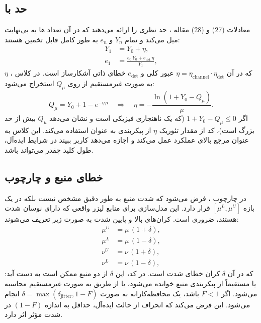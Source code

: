 \subsection{حد  با }

معادلات (27) و (28) مقاله ، حد نظری  را ارائه می‌دهند که در آن تعداد ‌ها به بی‌نهایت میل می‌کند و تمام $Y_n$ و $e_n$ به طور کامل قابل تخمین هستند:
\begin{align}
	Y_1 &= Y_0 + \eta, \\
	e_1 &= \frac{e_0\,Y_0 + e_{\text{det}}\,\eta}{Y_1},
\end{align}
که در آن $\eta = \eta_{\text{channel}} \cdot \eta_{\text{det}}$ عبور کلی و $e_{\text{det}}$ خطای ذاتی آشکارساز است. در کلاس ، $\eta$ به صورت غیرمستقیم از روی $Q_\mu$ استخراج می‌شود:
\begin{equation}
	Q_\mu = Y_0 + 1 - e^{-\eta\,\mu} \quad \Rightarrow \quad \eta = -\frac{\ln(1 + Y_0 - Q_\mu)}{\mu}.
\end{equation}
اگر $1 + Y_0 - Q_\mu \le 0$ (که یک ناهنجاری فیزیکی است و نشان می‌دهد $Q_\mu$ بیش از حد بزرگ است)، کد از مقدار تئوریک $\eta$ از پیکربندی به عنوان  استفاده می‌کند. این کلاس به عنوان مرجع بالای عملکرد عمل می‌کند و اجازه می‌دهد کاربر ببیند در شرایط ایده‌آل، طول کلید چقدر می‌تواند باشد.

\subsection{خطای منبع و چارچوب }

در چارچوب ، فرض می‌شود که شدت منبع به طور دقیق مشخص نیست بلکه در یک بازه $[\mu^L, \mu^U]$ قرار دارد. این مدل‌سازی برای منابع لیزر واقعی که دارای نوسان شدت هستند، ضروری است. کران‌های بالا و پایین شدت به صورت زیر تعریف می‌شوند:
\begin{align}
	\mu^U &= \mu\,(1 + \delta), \\
	\mu^L &= \mu\,(1 - \delta), \\
	\nu^U &= \nu\,(1 + \delta), \\
	\nu^L &= \nu\,(1 - \delta),
\end{align}
که در آن $\delta$ کران خطای شدت است. در کد، این $\delta$ از دو منبع ممکن است به دست آید: یا مستقیماً از  پیکربندی منبع خوانده می‌شود، یا از طریق  به صورت غیرمستقیم محاسبه می‌شود. اگر  $F < 1$ باشد، یک  محافظه‌کارانه به صورت $\delta = \max(\delta_{\text{jitter}}, 1 - F)$ انجام می‌شود. این  فرض می‌کند که انحراف از حالت  ایده‌آل، حداقل به اندازه $(1 - F)$ در شدت مؤثر اثر دارد.

